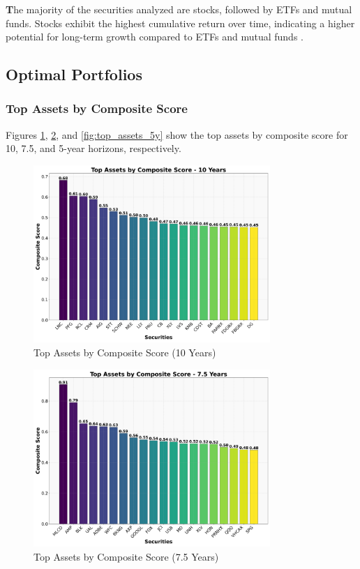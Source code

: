 \newpage

\textbf The majority of the securities analyzed are stocks, followed by ETFs and mutual funds. Stocks exhibit the highest cumulative return over time, indicating a higher potential for long-term growth compared to ETFs and mutual funds \citep{markowitz1952portfolio}.

\subsection{Optimal Portfolios}

\subsubsection{Top Assets by Composite Score}
Figures \ref{fig:top_assets_10y}, \ref{fig:top_assets_7_5y}, and \ref{fig:top_assets_5y} show the top assets by composite score for 10, 7.5, and 5-year horizons, respectively.

\begin{figure}[!htbp]
    \centering
    \includegraphics[width=0.8\textwidth]{../Figures/top_assets_composite_score_10_years.png}
    \caption{Top Assets by Composite Score (10 Years)}
    \label{fig:top_assets_10y}
\end{figure}

\begin{figure}[!htbp]
    \centering
    \includegraphics[width=0.8\textwidth]{../Figures/top_assets_composite_score_7_5_years.png}
    \caption{Top Assets by Composite Score (7.5 Years)}
    \label{fig:top_assets_7_5y}
\end{figure}

